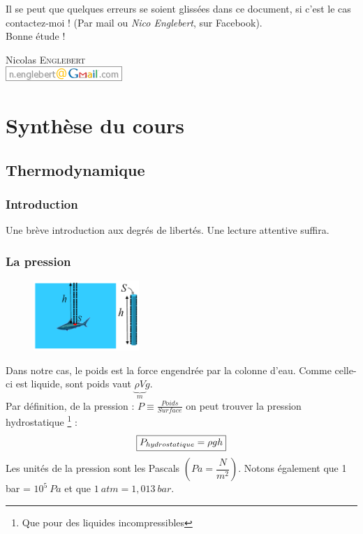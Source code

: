 \documentclass	[11pt, a4paper, openany]{book}
\begin{document}
Il se peut que quelques erreurs se soient glissées dans ce document, si c'est le cas contactez-moi ! (Par mail ou \textit{Nico Englebert}, sur Facebook).\\

Bonne étude ! 
\begin{flushright}
Nicolas \textsc{Englebert}\\
\includegraphics[scale=0.8]{gmail.png}
\end{flushright}



\mainmatter
\part{Synthèse du cours}
\chapter{Thermodynamique}
\section{Introduction}
Une brève introduction aux degrés de libertés. Une lecture attentive suffira.

\section{La pression}

\begin{figure}
\includegraphics[width=4cm]{th/image1.png}
\end{figure}

Dans notre cas, le poids est la force engendrée par la colonne d'eau. Comme celle-ci est liquide, sont poids vaut $\underbrace{\rho V}_m  g$.\\
Par définition, de la pression : $P \equiv \frac{Poids}{Surface}$ on peut trouver la pression hydrostatique \footnote{Que pour des liquides incompressibles} :
\begin{equation}
\fbox{$P_{hydrostatique} = \rho g h $}
\end{equation}
Les unités de la pression sont les Pascals $\left(Pa = \dfrac{N}{m^2}\right)$. Notons également que 1 bar = $10^5\ Pa$ et que $1\ atm = 1,013\ bar$.
\end{document}
